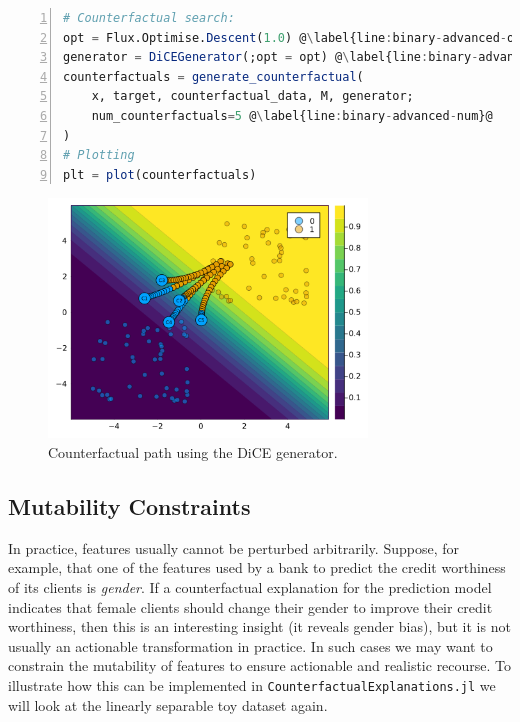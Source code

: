 \documentclass{juliacon}
\begin{document}
\begin{lstlisting}[language=Julia, escapechar=@, numbers=left, label={lst:binary-advanced}, caption={}]
# Counterfactual search:
opt = Flux.Optimise.Descent(1.0) @\label{line:binary-advanced-opt}@
generator = DiCEGenerator(;opt = opt) @\label{line:binary-advanced-dice}@
counterfactuals = generate_counterfactual(
    x, target, counterfactual_data, M, generator;
    num_counterfactuals=5 @\label{line:binary-advanced-num}@
)
# Plotting
plt = plot(counterfactuals)
\end{lstlisting}

\begin{figure}

{\centering \includegraphics[width=3.33333in,height=2.5in]{www/binary_advanced.png}

}

\caption{\label{fig-binary-advanced}Counterfactual path using the DiCE
generator.}

\end{figure}

\hypertarget{mutability-constraints}{%
\subsection{Mutability Constraints}\label{mutability-constraints}}

In practice, features usually cannot be perturbed arbitrarily. Suppose,
for example, that one of the features used by a bank to predict the
credit worthiness of its clients is \emph{gender}. If a counterfactual
explanation for the prediction model indicates that female clients
should change their gender to improve their credit worthiness, then this
is an interesting insight (it reveals gender bias), but it is not
usually an actionable transformation in practice. In such cases we may
want to constrain the mutability of features to ensure actionable and
realistic recourse. To illustrate how this can be implemented in
\texttt{CounterfactualExplanations.jl} we will look at the linearly
separable toy dataset again.
\end{document}
